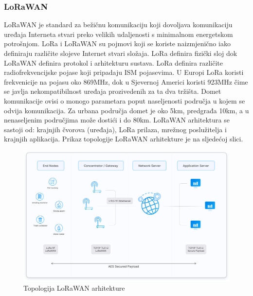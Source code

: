 \documentclass[times, utf8, diplomski]{fer}
\begin{document}
\subsubsection{LoRaWAN}
LoRaWAN  je standard za bežičnu komunikaciju koji dovoljava komunikaciju uređaja Interneta stvari preko velikih udaljenosti s minimalnom energetskom potrošnjom. LoRa i LoRaWAN su pojmovi koji se koriste naizmjenično iako definiraju različite slojeve Internet stvari složaja. LoRa definira fizički sloj dok LoRaWAN definira protokol i arhitekturu sustava. LoRa definira različite radiofrekvencijske pojase koji pripadaju ISM pojasevima. U Europi LoRa koristi frekvenicije na pojasu oko 869MHz, dok u Sjevernoj Americi koristi 923MHz čime se javlja nekompatibilnost uređaja prozivedenih za ta dva tržišta. Domet komunikacije ovisi o monogo parametara poput naseljenosti područja u kojem se odvija komunikacija. Za urbana područja domet je oko 5km, predgrađa 10km, a u nenaseljenim područjima može dostići i do 80km.
LoRaWAN arhitektura se sastoji od: krajnjih čvorova (uređaja), LoRa prilaza, mrežnog poslužitelja i krajnjih aplikacija. Prikaz topologije LoRaWAN arhitekture je na sljedećoj slici.
\begin{figure}[H]
    \centering
    \includegraphics[width=13cm]{images/lorawan.png}
    \caption{Topologija LoRaWAN arhitekture\citep{LoraWANImg}}
    \label{fig:lorawan}
\end{figure}
\end{document}
